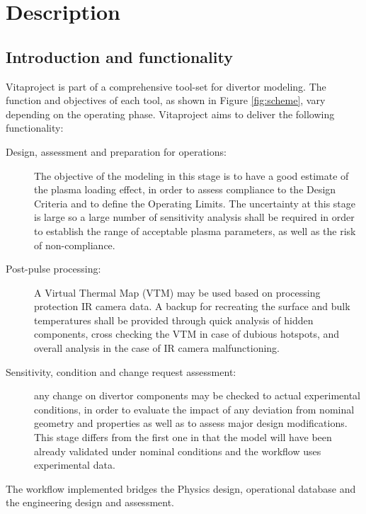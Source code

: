 \chapter{Description}

\section{Introduction and functionality}
Vitaproject is part of a comprehensive tool-set for divertor modeling. The function and objectives of each tool, as shown in Figure \ref{fig:scheme}, vary depending on the operating phase. Vitaproject aims to deliver the following functionality:
\begin{description}
	\item [Design, assessment and preparation for operations:] The objective of the modeling in this stage is to have a good estimate of the plasma loading effect, in order to assess compliance to the Design Criteria and to define the Operating Limits. The uncertainty at this stage is large so a large number of sensitivity analysis shall be required in order to establish the range of acceptable plasma parameters, as well as the risk of non-compliance.
	\item [Post-pulse processing:] A Virtual Thermal Map (VTM) may be used based on processing protection IR camera data. A backup for recreating the surface and bulk temperatures shall be provided through quick analysis of hidden components, cross checking the VTM in case of dubious hotspots, and overall analysis in the case of IR camera malfunctioning.
	\item [Sensitivity, condition and change request assessment:] any change on divertor components may be checked to actual experimental conditions, in order to evaluate the impact of any deviation from nominal geometry and properties as well as to assess major design modifications. This stage differs from the first one in that the model will have been already validated under nominal conditions and the workflow uses experimental data.
\end{description}

The workflow implemented bridges the Physics design, operational database and the engineering design and assessment.

